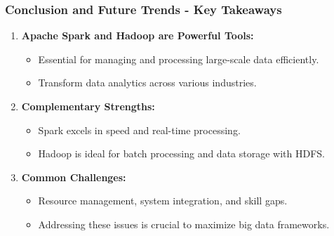 \documentclass{beamer}
\begin{document}
\begin{frame}[fragile]
    \frametitle{Conclusion and Future Trends - Key Takeaways}
    \begin{enumerate}
        \item \textbf{Apache Spark and Hadoop are Powerful Tools:}
        \begin{itemize}
            \item Essential for managing and processing large-scale data efficiently.
            \item Transform data analytics across various industries.
        \end{itemize}

        \item \textbf{Complementary Strengths:}
        \begin{itemize}
            \item Spark excels in speed and real-time processing.
            \item Hadoop is ideal for batch processing and data storage with HDFS.
        \end{itemize}

        \item \textbf{Common Challenges:}
        \begin{itemize}
            \item Resource management, system integration, and skill gaps.
            \item Addressing these issues is crucial to maximize big data frameworks.
        \end{itemize}
    \end{enumerate}
\end{frame}
\end{document}
